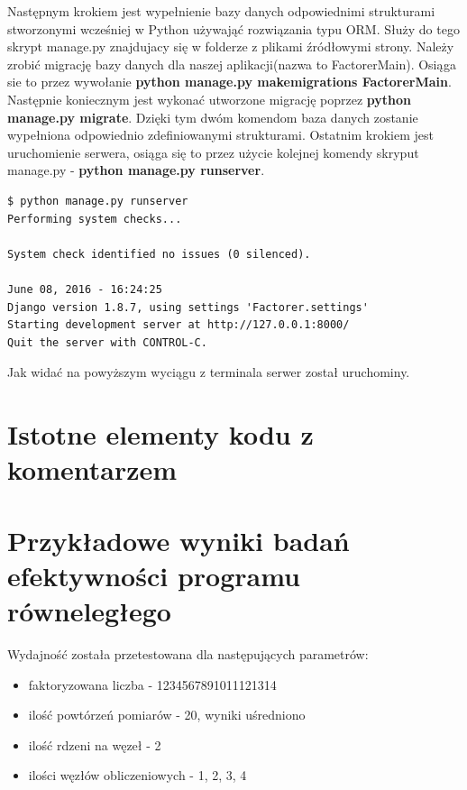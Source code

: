 \documentclass{article}
\begin{document}
Następnym krokiem jest wypełnienie bazy danych odpowiednimi strukturami stworzonymi wcześniej w Python używająć rozwiązania typu ORM. Służy do tego skrypt manage.py znajdujacy się w folderze z plikami źródłowymi strony. Należy zrobić migrację bazy danych dla naszej aplikacji(nazwa to FactorerMain). Osiąga sie to przez wywołanie \textbf{python manage.py makemigrations FactorerMain}. Następnie koniecznym jest wykonać utworzone migrację poprzez \textbf{python manage.py migrate}. Dzięki tym dwóm komendom baza danych zostanie wypełniona odpowiednio zdefiniowanymi strukturami. Ostatnim krokiem jest uruchomienie serwera, osiąga się to przez użycie kolejnej komendy skryput manage.py - \textbf{python manage.py runserver}.
\begin{lstlisting}
$ python manage.py runserver
Performing system checks...

System check identified no issues (0 silenced).

June 08, 2016 - 16:24:25
Django version 1.8.7, using settings 'Factorer.settings'
Starting development server at http://127.0.0.1:8000/
Quit the server with CONTROL-C.

\end{lstlisting}

Jak widać na powyższym wyciągu z terminala serwer został uruchominy.

\section{Istotne elementy kodu z komentarzem}

\newpage
\section{Przykładowe wyniki badań efektywności programu równeległego}

Wydajność została przetestowana dla następujących parametrów:
\begin{itemize}
\item faktoryzowana liczba - 1234567891011121314
\item ilość powtórzeń pomiarów - 20, wyniki uśredniono
\item ilość rdzeni na węzeł - 2
\item ilości węzłów obliczeniowych - 1, 2, 3, 4
\end{itemize}
\end{document}
